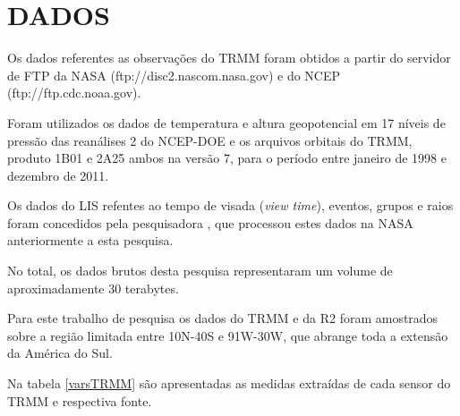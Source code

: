 \section{DADOS}

Os dados referentes as observações do TRMM foram obtidos a partir do servidor de FTP da NASA (ftp://disc2.nascom.nasa.gov) e do NCEP (ftp://ftp.cdc.noaa.gov).

Foram utilizados os dados de temperatura e altura geopotencial em 17 níveis de pressão das reanálises 2 do NCEP-DOE e os arquivos orbitais do TRMM, produto 1B01 e 2A25 ambos na versão 7, para o período entre janeiro de 1998 e dezembro de 2011. 



Os dados do LIS refentes ao tempo de visada (\textit{view time}), eventos, grupos e raios foram concedidos pela pesquisadora , que processou estes dados na NASA anteriormente a esta pesquisa. 

No total, os dados brutos desta pesquisa representaram um volume de  aproximadamente 30 terabytes. 

Para este trabalho de pesquisa os dados do TRMM e da R2 foram amostrados sobre a região limitada entre 10N-40S e 91W-30W, que abrange toda a extensão da América do Sul. 

Na tabela \ref{varsTRMM} são apresentadas as medidas extraídas de cada sensor do TRMM e respectiva fonte.


